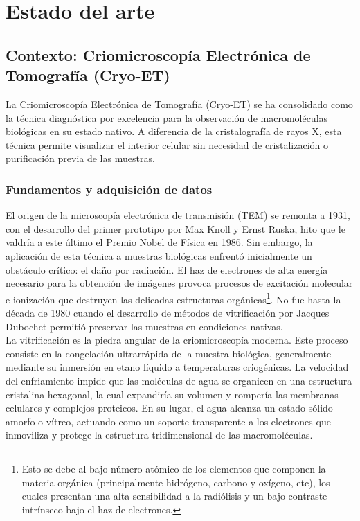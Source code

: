

\chapter{Estado del arte}

\section{Contexto: Criomicroscopía Electrónica de Tomografía (Cryo-ET)}
La Criomicroscopía Electrónica de Tomografía (Cryo-ET) se ha consolidado como la técnica diagnóstica por excelencia para la observación de macromoléculas biológicas en su estado nativo. A diferencia de la cristalografía de rayos X, esta técnica permite visualizar el interior celular sin necesidad de cristalización o purificación previa de las muestras.

\subsection{Fundamentos y adquisición de datos}
El origen de la microscopía electrónica de transmisión (TEM) se remonta a 1931, con el desarrollo del primer prototipo por Max Knoll y Ernst Ruska, hito que le valdría a este último el Premio Nobel de Física en 1986. Sin embargo, la aplicación de esta técnica a muestras biológicas enfrentó inicialmente un obstáculo crítico: el daño por radiación. El haz de electrones de alta energía necesario para la obtención de imágenes provoca procesos de excitación molecular e ionización que destruyen las delicadas estructuras orgánicas\footnote{Esto se debe al bajo número atómico de los elementos que componen la materia orgánica (principalmente hidrógeno, carbono y oxígeno, etc), los cuales presentan una alta sensibilidad a la radiólisis y un bajo contraste intrínseco bajo el haz de electrones.}. No fue hasta la década de 1980 cuando el desarrollo de métodos de vitrificación por Jacques Dubochet permitió preservar las muestras en condiciones nativas.\\

La vitrificación es la piedra angular de la criomicroscopía moderna. Este proceso consiste en la congelación ultrarrápida de la muestra biológica, generalmente mediante su inmersión en etano líquido a temperaturas criogénicas. La velocidad del enfriamiento impide que las moléculas de agua se organicen en una estructura cristalina hexagonal, la cual expandiría su volumen y rompería las membranas celulares y complejos proteicos. En su lugar, el agua alcanza un estado sólido amorfo o vítreo, actuando como un soporte transparente a los electrones que inmoviliza y protege la estructura tridimensional de las macromoléculas.\\

